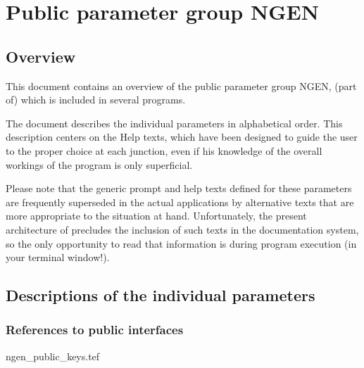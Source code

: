 
\chapter{ Public parameter group NGEN}
\tableofcontents


\section{ Overview}

	This document contains an overview of the public parameter group NGEN,
(part of) which is included in several \NEWSTAR programs.



	The
document describes the individual parameters in alphabetical order. This
description centers on the Help texts, which have been designed to guide the
user to the proper choice at each junction, even if his knowledge of the
overall workings of the program is only superficial.

	Please note that the generic prompt and help texts defined for these
parameters are frequently superseded in the actual applications by alternative
texts that are more appropriate to the situation at hand. Unfortunately, the
present architecture of \NEWSTAR precludes the inclusion of such texts in the
documentation system, so the only opportunity to read that information is
during program execution (in your terminal window!).


\section{ Descriptions of the individual parameters}
\label{.descriptions}

\subsection{ References to public interfaces}
\label{.public}

 {ngen_public_keys.tef}
